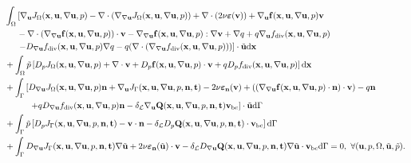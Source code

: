 \documentclass[oneside,11pt]{book}
\numberwithin{equation}{section}
\begin{document}
\begin{enumerate}[leftmargin=0mm]
    \begin{align*}
        &\int_\Omega \left[\nabla_{\bf u}J_\Omega({\bf x},{\bf u},\nabla{\bf u},p) - \nabla\cdot(\nabla_{\nabla{\bf u}}J_\Omega({\bf x},{\bf u},\nabla{\bf u},p)) + \nabla\cdot(2\nu\boldsymbol{\varepsilon}({\bf v})) + \nabla_{\bf u}{\bf f}({\bf x},{\bf u},\nabla{\bf u},p){\bf v}\right.\\
        &\hspace{5mm}- \nabla\cdot(\nabla_{\nabla{\bf u}}{\bf f}({\bf x},{\bf u},\nabla{\bf u},p))\cdot{\bf v} - \nabla_{\nabla{\bf u}}{\bf f}({\bf x},{\bf u},\nabla{\bf u},p):\nabla{\bf v} + \nabla q + q\nabla_{\bf u}f_{\rm div}({\bf x},{\bf u},\nabla{\bf u},p)\\
        &\hspace{5mm}\left.- D_{\nabla{\bf u}}f_{\rm div}({\bf x},{\bf u},\nabla{\bf u},p)\nabla q - q(\nabla\cdot(\nabla_{\nabla{\bf u}}f_{\rm div}({\bf x},{\bf u},\nabla{\bf u},p)))\right]\cdot\tilde{\bf u}{\rm d}{\bf x}\\
        &+\int_\Omega \tilde{p}\left[D_pJ_\Omega({\bf x},{\bf u},\nabla{\bf u},p) + \nabla\cdot{\bf v} + D_p{\bf f}({\bf x},{\bf u},\nabla{\bf u},p)\cdot{\bf v} + qD_pf_{\rm div}({\bf x},{\bf u},\nabla{\bf u},p)\right]{\rm d}{\bf x}\\
        &+\int_\Gamma \left[D_{\nabla{\bf u}}J_\Omega({\bf x},{\bf u},\nabla{\bf u},p){\bf n} + \nabla_{\bf u}J_\Gamma({\bf x},{\bf u},\nabla{\bf u},p,{\bf n},{\bf t}) - 2\nu\boldsymbol{\varepsilon}_{\bf n}({\bf v}) + ((\nabla_{\nabla{\bf u}}{\bf f}({\bf x},{\bf u},\nabla{\bf u},p)\cdot{\bf n})\cdot{\bf v}) - q{\bf n}\right.\\
        &\hspace{1cm}\left.+ qD_{\nabla{\bf u}}f_{\rm div}({\bf x},{\bf u},\nabla{\bf u},p){\bf n} - \delta_{\mathcal{L}}\nabla_{\bf u}{\bf Q}({\bf x},{\bf u},\nabla{\bf u},p,{\bf n},{\bf t}){\bf v}_{\rm bc}\right]\cdot\tilde{\bf u}{\rm d}\Gamma\\
        &+\int_\Gamma \tilde{p}\left[D_pJ_\Gamma({\bf x},{\bf u},\nabla{\bf u},p,{\bf n},{\bf t}) - {\bf v}\cdot{\bf n} - \delta_{\mathcal{L}}D_p{\bf Q}({\bf x},{\bf u},\nabla{\bf u},p,{\bf n},{\bf t})\cdot{\bf v}_{\rm bc}\right]{\rm d}\Gamma\\
        &+\int_\Gamma D_{\nabla{\bf u}}J_\Gamma({\bf x},{\bf u},\nabla{\bf u},p,{\bf n},{\bf t})\nabla\tilde{\bf u} + 2\nu\boldsymbol{\varepsilon}_{\bf n}(\tilde{\bf u})\cdot{\bf v} - \delta_{\mathcal{L}}D_{\nabla{\bf u}}{\bf Q}({\bf x},{\bf u},\nabla{\bf u},p,{\bf n},{\bf t})\nabla\tilde{\bf u}\cdot{\bf v}_{\rm bc}{\rm d}\Gamma = 0,\ \forall({\bf u},p,\Omega,\tilde{\bf u},\tilde{p}).

\end{align*}
\end{enumerate}
\end{document}
